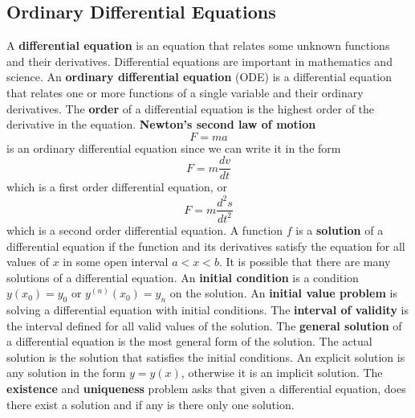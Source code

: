 \subsection{Ordinary Differential Equations}
A \textbf{differential equation} is an equation that relates some unknown
functions and their derivatives.
Differential equations are important in mathematics and science.
An \textbf{ordinary differential equation} (ODE) is a differential equation
that relates one or more functions of a single variable and their ordinary
derivatives.
The \textbf{order} of a differential equation is the highest order of the
derivative in the equation.
\textbf{Newton's second law of motion} \[F=ma\] is an ordinary differential
equation since we can write it in the form \[F=m\frac{dv}{dt}\] which is a first order
differential equation, or \[F=m\frac{d^2s}{dt^2}\] which is a second order
differential equation.
A function \(f\) is a \textbf{solution} of a differential equation if the
function and its derivatives satisfy the equation for all values of \(x\) in
some open interval \(a<x<b\).
It is possible that there are many solutions of a differential equation.
An \textbf{initial condition} is a condition \(y(x_0)=y_0\) or
\(y^{(n)}(x_0)=y_n\) on the solution.
An \textbf{initial value problem} is solving a differential equation with initial conditions.
The \textbf{interval of validity} is the interval defined for all valid values
of the solution.
The \textbf{general solution} of a differential equation is the most general form of
the solution.
The actual solution is the solution that satisfies the initial conditions.
An explicit solution is any solution in the form \(y=y(x)\), otherwise it is
an implicit solution.
The \textbf{existence} and \textbf{uniqueness} problem asks that given a
differential equation, does there exist a solution and if any is there only
one solution.